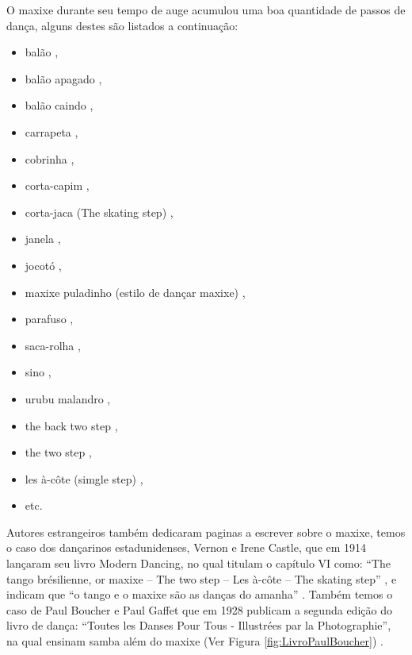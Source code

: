 O maxixe durante seu tempo de auge acumulou uma boa quantidade de passos de dança, 
alguns destes são listados a continuação: 
\begin{itemize} 
\item balão \cite[pp. 93]{efege1974maxixe} \cite[pp. 465]{marcondes1977enciclopedia}, 
\item balão apagado \cite[pp. 68]{efege1974maxixe} \cite[aproximadamente min. 11:35]{MaxixeDocumentario1},
\item balão caindo  \cite[pp. 129, 131]{efege1974maxixe} \cite[pp. 62]{tinhorao1986pequena},
\item carrapeta  \cite[pp. 465]{marcondes1977enciclopedia}, 
\item cobrinha \cite[pp. 62]{tinhorao1986pequena},
\item corta-capim \cite[pp. 465]{marcondes1977enciclopedia} \cite[pp. 62]{tinhorao1986pequena}, 
\item corta-jaca (The skating step) \cite[pp. 131]{efege1974maxixe} \cite[pp. 112]{castle1914modern},
\item janela  \cite[pp. 129]{efege1974maxixe},
\item jocotó \cite[pp. 83, 96, 173]{efege1974maxixe},
\item maxixe puladinho (estilo de dançar maxixe) \cite[pp. 177]{1920revista},
\item parafuso  \cite[pp. 68, 93, 129]{efege1974maxixe} \cite[pp. 465]{marcondes1977enciclopedia} \cite[pp. 62]{tinhorao1986pequena}, 
\item saca-rolha \cite[pp. 465]{marcondes1977enciclopedia}, 
\item sino \cite[pp. 68]{efege1974maxixe}, 
\item urubu malandro \cite[pp. 131]{efege1974maxixe},

\item the back two step \cite[pp. 119]{castle1914modern},
\item the two step \cite[pp. 108]{castle1914modern},
\item les à-côte (simgle step) \cite[pp. 112]{castle1914modern},
\item etc. 
\end{itemize}

Autores estrangeiros também dedicaram paginas a escrever sobre o maxixe,
temos o caso dos dançarinos estadunidenses, Vernon e Irene Castle, 
que em 1914 lançaram seu livro Modern Dancing,
no qual titulam o capítulo VI como: ``The tango brésilienne, 
or maxixe -- The two step -- Les à-côte -- The skating step'' \cite[pp. 107]{castle1914modern},
e indicam que ``o tango e o maxixe são as danças do amanha'' \cite[pp. 85]{castle1914modern}.
Também temos o caso de Paul Boucher e Paul Gaffet que em 1928
publicam a segunda edição do livro de dança: 
``Toutes les Danses Pour Tous - Illustrées par la Photographie'',
na qual ensinam samba além do maxixe (Ver Figura \ref{fig:LivroPaulBoucher}) \cite[pp. 14779]{library1929catalog}. 

